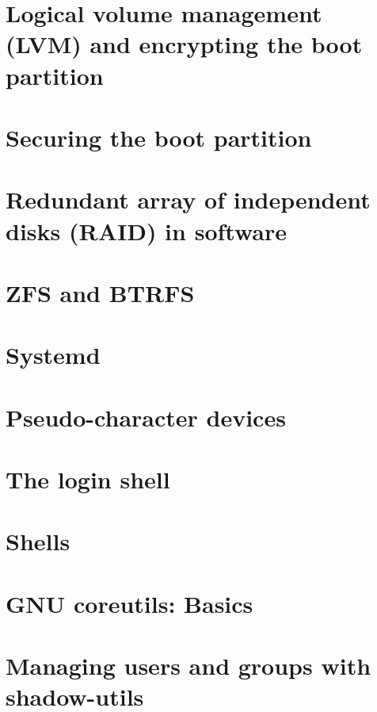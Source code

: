 \documentclass[oneside]{book}
\begin{document}
\part{Logical volume management (LVM) and encrypting the boot partition}


\part{Securing the boot partition}



\part{Redundant array of independent disks (RAID) in software}


\part{ZFS and BTRFS}



\part{Systemd}


\part{Pseudo-character devices}



\part{The login shell}

\part{Shells}






\part{GNU coreutils: Basics}






\part{Managing users and groups with shadow-utils}



\end{document}
